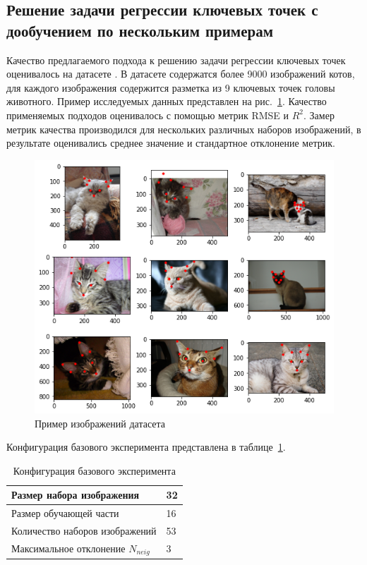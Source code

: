 \documentclass[a4paper,14pt]{article}
\begin{document}
    \subsection{Решение задачи регрессии ключевых точек с дообучением по нескольким примерам} \label{kpoints_exp}
     
    Качество предлагаемого подхода к решению задачи регрессии ключевых точек оценивалось на датасете \cite{cat_dataset}. 
    В датасете содержатся более 9000 изображений котов, для каждого изображения содержится разметка из 9 ключевых точек головы животного.
    Пример исследуемых данных представлен на рис.~\ref{fig:example_cat_dataset}.
    Качество применяемых подходов оценивалось с помощью метрик RMSE и $R^2$.
    Замер метрик качества производился для нескольких различных наборов изображений, в результате оценивались среднее значение и стандартное отклонение метрик.
    
    \begin{figure}[H]
    	\centering
    	\includegraphics[width=0.6\linewidth]{images/example_cat_dataset}
    	\caption{Пример изображений датасета \cite{cat_dataset}}
    	\label{fig:example_cat_dataset}
    \end{figure}
    
    Конфигурация базового эксперимента представлена в таблице~\ref{tab:base_config}.
    \begin{center}
    	\begin{table}[H]
    		\centering
    		\caption{Конфигурация базового эксперимента}
    		\label{tab:base_config}
    		\bgroup
    		\def\arraystretch{1.5}
    		\begin{tabular}{| l | l |}
    			\hline
    			Размер набора изображения & 32\\ \hline
    			Размер обучающей части & 16\\ \hline
    			Количество наборов изображений & 53\\ \hline
    			Максимальное отклонение  $N_{neig}$ & 3\\
    			\hline
    		\end{tabular}
    		\egroup
    	\end{table}
    \end{center}
    
\end{document}
